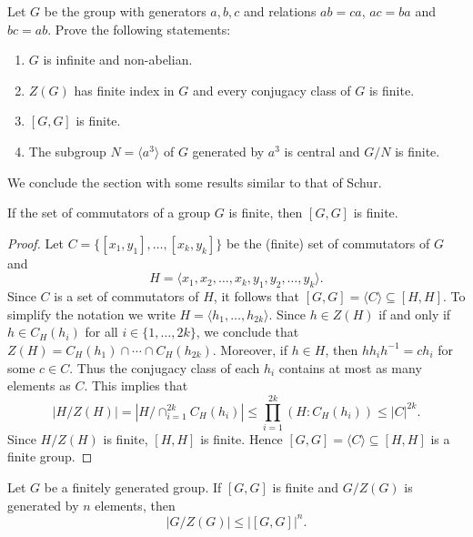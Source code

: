 \begin{exercise}
    Let $G$ be the group with generators $a,b,c$ and 
    relations $ab=ca$, $ac=ba$ and $bc=ab$. Prove the following statements:
    \begin{enumerate}
        \item $G$ is infinite and non-abelian.
        \item $Z(G)$ has finite index in $G$ and every conjugacy class of $G$ is finite.
        \item $[G,G]$ is finite. 
        \item The subgroup $N=\langle a^3\rangle$ of $G$ 
        generated by $a^3$ is central 
        and $G/N$ is finite.
    \end{enumerate}
\end{exercise}

We conclude the section with some results similar to that of Schur. 

\begin{theorem}[Niroomand]
\label{thm:Niroomand}
	If the set of commutators of a group $G$ is finite, then 
	$[G,G]$ is finite.
\end{theorem}

\begin{proof}
 	Let $C=\{[x_1,y_1],\dots,[x_k,y_k]\}$ be the (finite) set of commutators of $G$ and  
	\[
    H=\langle x_1,x_2,\dots,x_k,y_1,y_2,\dots,y_k\rangle.
    \]
    Since $C$ is a set of commutators of $H$, 
	it follows that 
	$[G,G]=\langle C\rangle\subseteq [H,H]$. To simplify the notation we write 
	$H=\langle h_1,\dots,h_{2k}\rangle$. 	
 	Since $h\in Z(H)$ if and only if $h\in C_H(h_i)$ for all 
	$i\in\{1,\dots,2k\}$, we conclude that $Z(H)=C_H(h_1)\cap\cdots\cap C_H(h_{2k})$. Moreover, if 
	$h\in H$, then $hh_ih^{-1}=ch_i$ for some $c\in C$. Thus the conjugacy class of each 
	$h_i$ contains at most as many elements as $C$. This implies that 
	\[
		|H/Z(H)|=|H/\cap_{i=1}^{2k} C_H(h_i)|\leq\prod_{i=1}^{2k} (H:C_H(h_i))\leq |C|^{2k}.
	\]
	Since $H/Z(H)$ is finite, $[H,H]$ is finite. Hence  
	$[G,G]=\langle C\rangle\subseteq [H,H]$ 
	is a finite group. 
\end{proof}

\begin{theorem}
	\label{thm:HiltonNiroomand}
	Let $G$ be a finitely generated group. If $[G,G]$ is finite and $G/Z(G)$ is generated by
	$n$ elements, then  
	\[
	|G/Z(G)|\leq |[G,G]|^n. 
	\]
\end{theorem}

